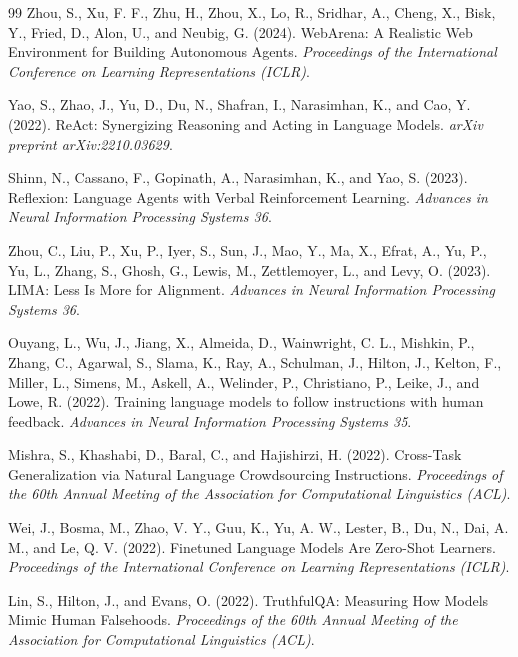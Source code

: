 \documentclass[11pt]{article}
\begin{document}
\begin{thebibliography}{99}
Zhou, S., Xu, F. F., Zhu, H., Zhou, X., Lo, R., Sridhar, A., Cheng, X., Bisk, Y., Fried, D., Alon, U., and Neubig, G. (2024).
\newblock WebArena: A Realistic Web Environment for Building Autonomous Agents.
\newblock \emph{Proceedings of the International Conference on Learning Representations (ICLR)}.

Yao, S., Zhao, J., Yu, D., Du, N., Shafran, I., Narasimhan, K., and Cao, Y. (2022).
\newblock ReAct: Synergizing Reasoning and Acting in Language Models.
\newblock \emph{arXiv preprint arXiv:2210.03629}.

Shinn, N., Cassano, F., Gopinath, A., Narasimhan, K., and Yao, S. (2023).
\newblock Reflexion: Language Agents with Verbal Reinforcement Learning.
\newblock \emph{Advances in Neural Information Processing Systems 36}.

Zhou, C., Liu, P., Xu, P., Iyer, S., Sun, J., Mao, Y., Ma, X., Efrat, A., Yu, P., Yu, L., Zhang, S., Ghosh, G., Lewis, M., Zettlemoyer, L., and Levy, O. (2023).
\newblock LIMA: Less Is More for Alignment.
\newblock \emph{Advances in Neural Information Processing Systems 36}.

Ouyang, L., Wu, J., Jiang, X., Almeida, D., Wainwright, C. L., Mishkin, P., Zhang, C., Agarwal, S., Slama, K., Ray, A., Schulman, J., Hilton, J., Kelton, F., Miller, L., Simens, M., Askell, A., Welinder, P., Christiano, P., Leike, J., and Lowe, R. (2022).
\newblock Training language models to follow instructions with human feedback.
\newblock \emph{Advances in Neural Information Processing Systems 35}.

Mishra, S., Khashabi, D., Baral, C., and Hajishirzi, H. (2022).
\newblock Cross-Task Generalization via Natural Language Crowdsourcing Instructions.
\newblock \emph{Proceedings of the 60th Annual Meeting of the Association for Computational Linguistics (ACL)}.

Wei, J., Bosma, M., Zhao, V. Y., Guu, K., Yu, A. W., Lester, B., Du, N., Dai, A. M., and Le, Q. V. (2022).
\newblock Finetuned Language Models Are Zero-Shot Learners.
\newblock \emph{Proceedings of the International Conference on Learning Representations (ICLR)}.

Lin, S., Hilton, J., and Evans, O. (2022).
\newblock TruthfulQA: Measuring How Models Mimic Human Falsehoods.
\newblock \emph{Proceedings of the 60th Annual Meeting of the Association for Computational Linguistics (ACL)}.


\end{thebibliography}
\end{document}
